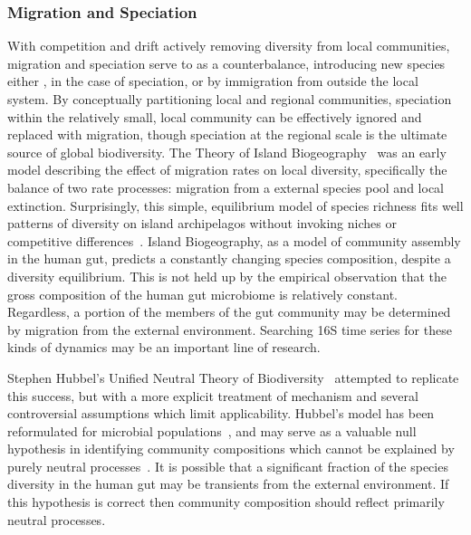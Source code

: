 \documentclass[12pt]{article}
\begin{document}
\subsubsection{Migration and Speciation}
With competition and drift actively removing diversity from local
communities, migration and speciation serve to as a counterbalance,
introducing new species either ,
in the case of speciation, or by immigration from outside the
local system.
By conceptually partitioning local and regional communities,
speciation within the relatively small, local community can be effectively
ignored and replaced with migration,
though speciation at the regional scale is the ultimate source of global
biodiversity.
The Theory of Island Biogeography~\citep{macarthur1967b} was
an early model describing the effect of migration rates on local diversity,
specifically the balance of two rate processes:
migration from a external species pool and local extinction.
Surprisingly, this simple, equilibrium model of species richness
fits well patterns of diversity on island archipelagos
without invoking niches or competitive differences~\citep{TODO}.
Island Biogeography, as a model of community assembly in the human gut,
predicts a constantly changing species composition,
despite a diversity equilibrium.
This is not held up by the empirical observation that the gross composition of
the human gut microbiome is relatively constant.
Regardless, a portion of the members of the gut community may be determined
by migration from the external environment.
Searching 16S time series for these kinds of dynamics may be an important
line of research.

Stephen Hubbel's Unified Neutral Theory of Biodiversity~\citeyearpar{TODO}
attempted to replicate this success,
but with a more explicit treatment of mechanism
and several controversial assumptions which limit applicability.
Hubbel's model has been
reformulated for microbial populations~\citep{Sloan2005},
and may serve as a valuable null hypothesis in identifying community
compositions which cannot be explained
by purely neutral processes~\cite{VenkataramenTODO}.
It is possible that
a significant fraction of the species diversity in the human gut may be
transients from the external environment.
If this hypothesis is correct then community composition should reflect
primarily neutral processes.
\end{document}
